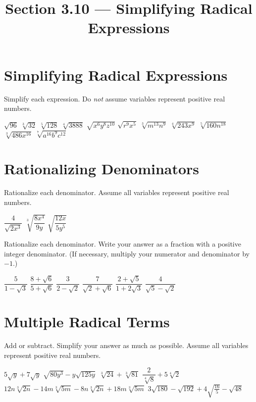 

\title{Section 3.10 --- Simplifying Radical Expressions}


\maketitle

\section*{Simplifying Radical Expressions}
Simplify each expression. Do \emph{not} assume variables represent positive real numbers.
\begin{smenum}
\mitemxxxx
{$\sqrt{96}$}
{$\sqrt[3]{32}$}
{$\sqrt[5]{128}$}
{$\sqrt[4]{3888}$}
\mitemxxxx
{$\sqrt{x^6y^8z^{10}}$}
{$\sqrt{r^9x^5}$}
{$\sqrt[3]{m^{13}n^9}$}
{$\sqrt[4]{243x^9}$}
\mitemxxxo
{$\sqrt[5]{160n^{18}}$}
{$\sqrt[3]{486x^{16}}$}
{$\sqrt[7]{a^{16}b^9c^{12}}$}
\end{smenum}

\section*{Rationalizing Denominators}
Rationalize each denominator. Assume all variables represent positive real numbers.
\begin{smenum}
\mitemxxx
{$\dfrac{4}{\sqrt{2x^3}}$}
{$\sqrt[3]{\dfrac{8x^4}{9y}}$}
{$\sqrt{\dfrac{12x}{5y^5}}$}
\end{smenum}
Rationalize each denominator. Write your answer as a fraction with a positive integer denominator. (If necessary, multiply your numerator and denominator by $-1$.)
\begin{smenum}
\mitemxxx
{$\dfrac{5}{1-\sqrt{3}}$}
{$\dfrac{8+\sqrt{6}}{5+\sqrt{6}}$}
{$\dfrac{3}{2-\sqrt{2}}$}
\mitemxxx
{$\dfrac{7}{\sqrt{2}+\sqrt{6}}$}
{$\dfrac{2+\sqrt{5}}{1+2\sqrt{3}}$}
{$\dfrac{4}{\sqrt{5}-\sqrt{2}}$}
\end{smenum}

\section*{Multiple Radical Terms}
Add or subtract.  Simplify your answer as much as possible. Assume all variables represent positive real numbers.
\begin{smenum}
\mitemxxxx
{$5\sqrt{y}+7\sqrt{y}$}
{$\sqrt{80y^3}-y\sqrt{125y}$}
{$\sqrt[3]{24}+\sqrt[3]{81}$}
{$\dfrac{2}{\sqrt[4]{8}}+5\sqrt[4]{2}$}
\mitemxx
{$12n\sqrt[3]{2n}-14m\sqrt[3]{5m}-8n\sqrt[3]{2n}+18m\sqrt[3]{5m}$}
{$3\sqrt{180}-\sqrt{192}+4\sqrt{\frac{16}{5}}-\sqrt{48}$}
\end{smenum}

